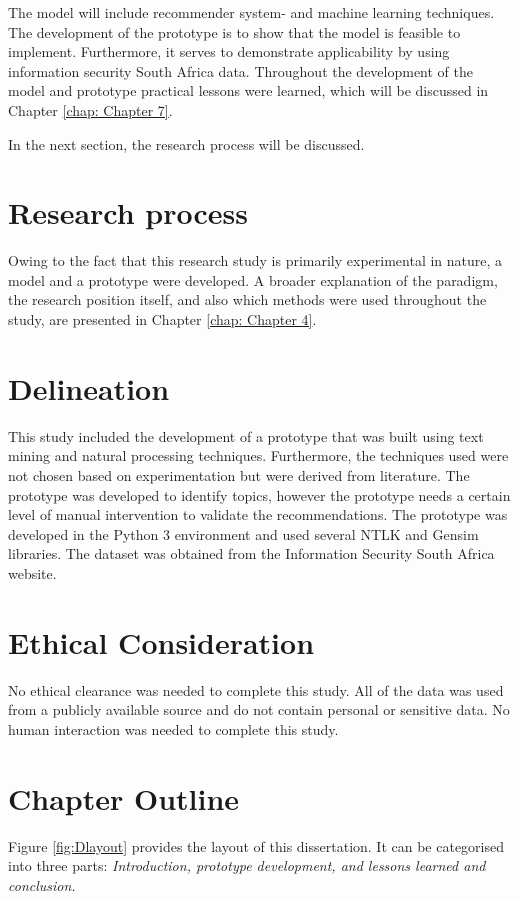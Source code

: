 The model will include recommender system- and machine learning techniques. The development of the prototype is to show that the model is feasible to implement. Furthermore, it serves to demonstrate applicability by using information security South Africa data. Throughout the development of the model and prototype practical lessons were learned, which will be discussed in Chapter \ref{chap: Chapter 7}.

In the next section, the research process will be discussed.

\section{Research process}

Owing to the fact that this research study is primarily experimental in nature, a model and a prototype were developed. A broader explanation of the paradigm, the research position itself, and also which methods were used throughout the study, are presented in Chapter \ref{chap: Chapter 4}.

\section{Delineation}

This study included the development of a prototype that was built using text mining and natural processing techniques. Furthermore, the techniques used were not chosen based on experimentation but were derived from literature. 
The prototype was developed to identify topics, however the prototype needs a certain level of manual intervention to validate the recommendations. 
The prototype was developed in the Python 3 environment and used several NTLK and Gensim libraries. The dataset was obtained from the Information Security South Africa website. 


\section{Ethical Consideration}

No ethical clearance was needed to complete this study. All of the data was used from a publicly available source and do not contain personal or sensitive data. No human interaction was needed to complete this study.

\section{Chapter Outline}
Figure \ref{fig:Dlayout} provides the layout of this dissertation. It can be categorised into three parts: 
\textit{Introduction, prototype development, and lessons learned and conclusion.}

